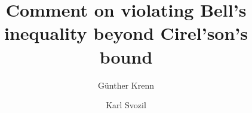 \documentclass[prl,preprint]{revtex4}





\title{Comment on violating {B}ell's inequality beyond {C}irel'son's bound}
\author{G\"unther Krenn}
\author{Karl Svozil}




\maketitle

In a recent Letter \cite{cabello-02a}, Ad\'{a}n Cabello pointed out the
possibility to violate the Clauser, Horne, Shimony, and Holt (CHSH)
inequality beyond {C}irel'son's bound.
The correlation of a {\em postselected} subsystem of a three-qubit system
prepared in a Greenberger, Horne, and Zeilinger (GHZ) state
allows the maximal violation of the CHSH inequality.

However, we do not see any way to use the author's scheme to test
quantum nonlocality, since, by using postselection, even classical systems can
violate the CHSH inequality up to the maximal value of 4.
It would therefore be desirable to explicate the advantages of quantum
systems over classical ones.


